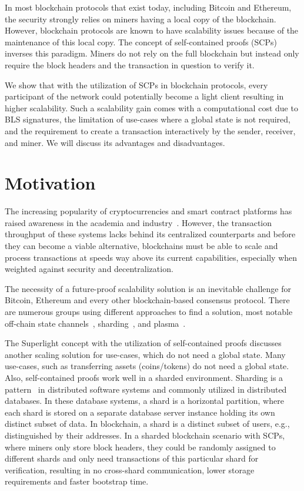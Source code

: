 \documentclass[conference]{IEEEtran}
\begin{document}
In most blockchain protocols that exist today, including Bitcoin and Ethereum, the security strongly relies on miners having a local copy of the blockchain. However, blockchain protocols are known to have scalability issues because of the maintenance of this local copy. The concept of self-contained proofs (SCPs) inverses this paradigm. Miners do not rely on the full blockchain but instead only require the block headers and the transaction in question to verify it. 

We show that with the utilization of SCPs in blockchain protocols, every participant of the network could potentially become a light client resulting in higher scalability. Such a scalability gain comes with a computational cost due to BLS signatures, the limitation of use-cases where a global state is not required, and the requirement to create a transaction interactively by the sender, receiver, and miner. We will discuss its advantages and disadvantages.

\section{Motivation}
The increasing popularity of cryptocurrencies and smart contract platforms has raised awareness in the academia and industry~\cite{BitcoinNG16, Zilliqa18, OmniLedger18}. However, the transaction throughput of these systems lacks behind its centralized counterparts and before they can become a viable alternative, blockchains must be able to scale and process transactions at speeds way above its current capabilities, especially when weighted against security and decentralization.

The necessity of a future-proof scalability solution is an inevitable challenge for Bitcoin, Ethereum and every other blockchain-based consensus protocol. There are numerous groups using different approaches to find a solution, most notable off-chain state channels~\cite{Poon18Lightning, RaidenNetwork}, sharding~\cite{Zilliqa18, Luu16}, and plasma~\cite{Poon18Plasma}.

The Superlight concept with the utilization of self-contained proofs discusses another scaling solution for use-cases, which do not need a global state. Many use-cases, such as transferring assets (coins/tokens) do not need a global state. Also, self-contained proofs work well in a sharded environment. Sharding is a pattern~\cite{ShardingMS} in distributed software systems and commonly utilized in distributed databases. In these database systems, a shard is a horizontal partition, where each shard is stored on a separate database server instance holding its own distinct subset of data. In blockchain, a shard is a distinct subset of users, e.g., distinguished by their addresses. In a sharded blockchain scenario with SCPs, where miners only store block headers, they could be randomly assigned to different shards and only need transactions of this particular shard for verification, resulting in no cross-shard communication, lower storage requirements and faster bootstrap time.
\end{document}
